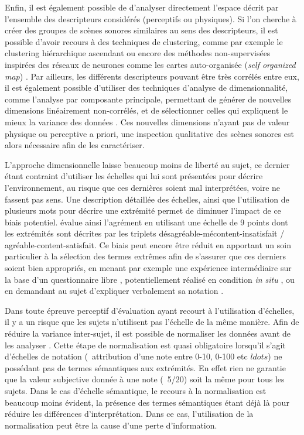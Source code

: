 Enfin, il est également possible de d'analyser directement l'espace décrit par l'ensemble des descripteurs considérés (perceptifs ou physiques). Si l'on cherche à créer des groupes de scènes sonores similaires au sens des descripteurs, il est possible d'avoir recours à des techniques de clustering, comme par exemple le clustering hiérarchique ascendant \citep{torija2013application} ou encore des méthodes non-supervisées inspirées des réseaux de neurones comme les cartes auto-organisée (\emph{self organized map}) \citep{ricciardi2015sound}. Par ailleurs, les différents descripteurs pouvant être très corrélés entre eux, il est également possible d'utiliser des techniques d'analyse de dimensionnalité, comme l'analyse par composante principale, permettant de générer de nouvelles dimensions linéairement non-corrélés, et de sélectionner celles qui expliquent le mieux la variance des données \citep{cain2013development,torija2013application}. Ces nouvelles dimensions n'ayant pas de valeur physique ou perceptive a priori, une inspection qualitative des scènes sonores est alors nécessaire afin de les caractériser.

L'approche dimensionnelle laisse beaucoup moins de  liberté au sujet, ce dernier étant contraint d'utiliser les échelles qui lui sont présentées pour décrire l'environnement, au risque que ces dernières soient mal interprétées, voire ne fassent pas sens. Une description détaillée des échelles, ainsi que l'utilisation de plusieurs mots pour décrire une extrémité permet de diminuer l'impact de ce biais potentiel. \citep{hall2013exploratory} évalue ainsi l'agrément en utilisant une échelle de 9 points dont les extrémités sont décrites par les triplets désagréable-mécontent-insatisfait / agréable-content-satisfait. Ce biais peut encore être réduit en apportant un soin particulier à la sélection des termes extrêmes afin de s'assurer que ces derniers soient bien appropriés, en menant par exemple une expérience intermédiaire sur la base d'un questionnaire libre \citep{guastavino2004perceptual}, potentiellement réalisé en condition \emph{in situ} \citep{kang2010semantic,hong2013designing}, ou en demandant au sujet d'expliquer verbalement sa notation \citep{raimbault2006qualitative}. 

Dans toute épreuve perceptif d'évaluation ayant recourt à l'utilisation d'échelles, il y a un risque que les sujets n'utilisent pas l'échelle de la même manière. Afin de réduire la variance inter-sujet, il est possible de normaliser les données avant de les analyser \citep{defreville2004aactivity,lavandier2006contribution,nielbo2013investigating,hong2013designing}. Cette étape de normalisation est quasi obligatoire lorsqu'il s'agit d'échelles de notation (\eg~attribution d'une note entre 0-10, 0-100 etc $ldots$) ne possédant pas de termes sémantiques aux extrémités. En effet rien ne garantie que la valeur subjective donnée à une note (\eg~5/20) soit la même pour tous les sujets. Dans le cas d'échelle sémantique, le recours à la normalisation est beaucoup moins évident, la présence des termes sémantiques étant déjà là pour réduire les différences d'interprétation. Dans ce cas, l'utilisation de la normalisation peut être la cause d'une perte d'information.

